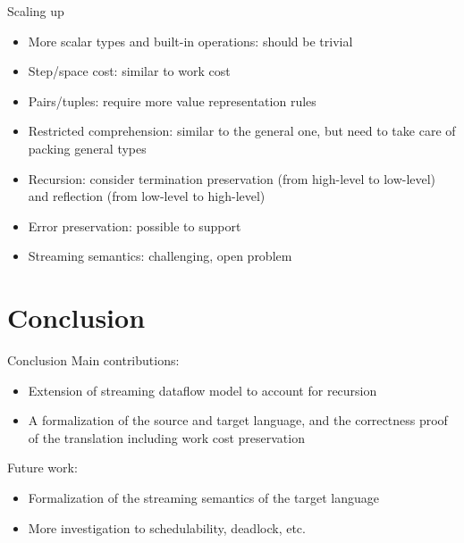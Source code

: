 \documentclass{beamer}
\begin{document}
\begin{frame}{Scaling up}
\begin{itemize}
	\item More scalar types and built-in operations: should be trivial
	\item Step/space cost: similar to work cost
	\item Pairs/tuples: require more value representation rules
	\item Restricted comprehension: similar to the general one, but need to take care of packing general types 
	\item Recursion: consider termination preservation (from high-level to low-level) and reflection (from low-level to high-level) 
	\item Error preservation: possible to support
	\item Streaming semantics: challenging, open problem
\end{itemize}
\end{frame}


\section{Conclusion}

\begin{frame}{Conclusion}
	Main contributions:
	\begin{itemize}
		\item Extension of streaming dataflow model to account for recursion 
		\item A formalization of the source and target language, and the correctness proof of the translation including work cost preservation
	\end{itemize}

	Future work:
	\begin{itemize}
	\item Formalization of the streaming semantics of the target language
	\item More investigation to schedulability, deadlock, etc.
	\end{itemize}
\end{frame}

\end{document}
